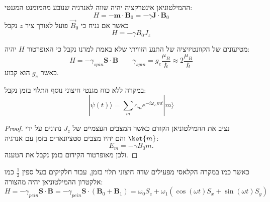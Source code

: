\documentclass{tstextbook}
\begin{document}
\begin{proposition}
ההמילטוניאן אינטרקציה יהיה שווה לאנרגיה שנובע מהמומנט המגנטי:
$$H=-\mathbf{m}\cdot\mathbf{B}_{0}=-\gamma\mathbf{J}\cdot\mathbf{B}_{0}$$
כאשר אם נניח כי \(\vec{B}_{0}\) פועל לאורך ציר \(z\) נקבל
$$H=-\gamma B_{0}J_{z}$$

\end{proposition}
\begin{corollary}
מטיעונים של הקוונטיזיציה של התנע הזוויתי שלא באמת למדנו נקבל כי האופרטור \(H\) יהיה:
$$H=-\gamma_{s p i n}{\mathbf{S}}\cdot{\mathbf{B}}\qquad\gamma_{s p i n}=g_{e}{\frac{\mu_{B}}{\hbar}}\approx2{\frac{\mu_{B}}{\hbar}}$$
כאשר \(g_{e}\) הוא קבוע.

\end{corollary}
\begin{proposition}
במקרה ללא כוח מגנטי חיצוני נוסף התלוי בזמן נקבל:
$$|\psi(t)\rangle=\sum_{m}c_{m}e^{-i\omega_{L}m t}|m\rangle$$

\end{proposition}
\begin{proof}
נציב את ההמילטוניאן הקודם כאשר המצבים העצמיים של \(J_{z}\) נתונים על ידי \(\ket{m}\) והם יהיו מצבים סטציונארים בזמן עם אנרגיה:
$$E_{m}=-\gamma B_{0}m.$$
ולכן מאופרטור הקידום בזמן נקבל את הטענה.

\end{proof}
\begin{proposition}
כאשר כמו במקרה הקלאסי מפעילים שדה חיצוני תלוי בזמן, עבור חלקיקים בעל ספין \(\frac{1}{2}\) כמו אלקטרון ההמילטוניאן יהיה מהצורה:
$$H=-\gamma_{p e i n}{\mathbf{S}}\cdot{\mathbf{B}}=-\gamma_{p e i n}{\mathbf{S}}\cdot({\mathbf{B}}_{0}+{\mathbf{B}}_{1})=\omega_{0}S_{z}+\omega_{1}\left(\cos(\omega t)S_{x}+\sin(\omega t)S_{y}\right)$$

\end{proposition}
\end{document}
